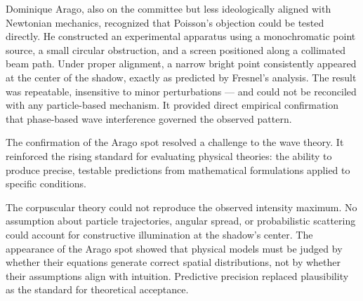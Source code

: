 Dominique Arago, also on the committee but less ideologically aligned with Newtonian mechanics, recognized that Poisson's objection could be tested directly. He constructed an experimental apparatus using a monochromatic point source, a small circular obstruction, and a screen positioned along a collimated beam path. Under proper alignment, a narrow bright point consistently appeared at the center of the shadow, exactly as predicted by Fresnel's analysis. The result was repeatable, insensitive to minor perturbations — and could not be reconciled with any particle-based mechanism. It provided direct empirical confirmation that phase-based wave interference governed the observed pattern.

The confirmation of the Arago spot resolved a challenge to the wave theory. It reinforced the rising standard for evaluating physical theories: the ability to produce precise, testable predictions from mathematical formulations applied to specific conditions.

The corpuscular theory could not reproduce the observed intensity maximum. No assumption about particle trajectories, angular spread, or probabilistic scattering could account for constructive illumination at the shadow's center. The appearance of the Arago spot showed that physical models must be judged by whether their equations generate correct spatial distributions, not by whether their assumptions align with intuition. Predictive precision replaced plausibility as the standard for theoretical acceptance.

